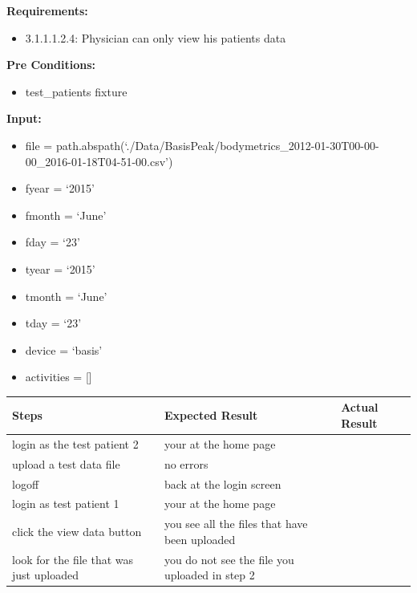 \documentclass[letterpaper,10pt,english]{sphinxmanual}
\begin{document}
\begin{fulllineitems}
\label{STD/test_security:test_security.test_patient_only_sees_his_data}
\textbf{Requirements:}
\begin{itemize}
\item {} 
3.1.1.1.2.4: Physician can only view his patients data

\end{itemize}

\textbf{Pre Conditions:}
\begin{itemize}
\item {} 
test\_patients fixture

\end{itemize}

\textbf{Input:}
\begin{itemize}
\item {} 
file = path.abspath(`./Data/BasisPeak/bodymetrics\_2012-01-30T00-00-00\_2016-01-18T04-51-00.csv')

\item {} 
fyear = `2015'

\item {} 
fmonth = `June'

\item {} 
fday = `23'

\item {} 
tyear = `2015'

\item {} 
tmonth = `June'

\item {} 
tday = `23'

\item {} 
device = `basis'

\item {} 
activities = {[}{]}

\end{itemize}

\begin{tabulary}{\linewidth}{|L|L|L|}
\hline
\textsf{\relax 
Steps
} & \textsf{\relax 
Expected Result
} & \textsf{\relax 
Actual Result
}\\
\hline
login as the test patient 2
 & 
your at the home page
 & \\
\hline
upload a test data file
 & 
no errors
 & \\
\hline
logoff
 & 
back at the login screen
 & \\
\hline
login as test patient 1
 & 
your at the home page
 & \\
\hline
click the view data button
 & 
you see all the files that have been uploaded
 & \\
\hline
look for the file that was just uploaded
 & 
you do not see the file you uploaded in step 2
 & \\
\hline\end{tabulary}


\end{fulllineitems}
\end{document}
